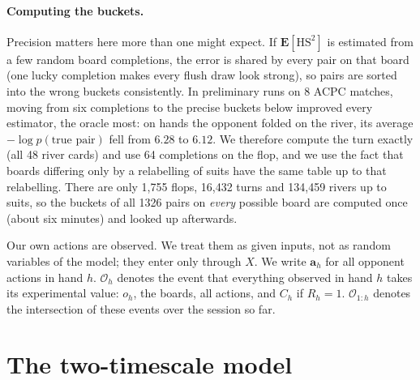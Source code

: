 \documentclass[11pt,a4paper]{article}
\newcommand{\C}{C}            %
\newcommand{\X}{X}            %
\newcommand{\R}{R}            %
\newcommand{\1}{\mathbf{1}}
\begin{document}
\paragraph{Computing the buckets.} Precision matters here more than one might
expect. If $\mathbf{E}[\mathrm{HS}^2]$ is estimated from a few random board
completions, the error is shared by every pair on that board (one lucky
completion makes every flush draw look strong), so pairs are sorted into the
wrong buckets consistently. In preliminary runs on 8 ACPC matches, moving from
six completions to the precise buckets below improved every estimator, the
oracle most: on hands the opponent folded on the river, its average
$-\log p(\text{true pair})$ fell from $6.28$ to $6.12$. We therefore compute the turn exactly (all 48 river cards)
and use 64 completions on the flop, and we use the fact that boards differing
only by a relabelling of suits have the same table up to that relabelling. There
are only 1{,}755 flops, 16{,}432 turns and 134{,}459 rivers up to suits, so the
buckets of all 1326 pairs on \emph{every} possible board are computed once
(about six minutes) and looked up afterwards.

Our own actions are observed. We treat them as given inputs, not as random
variables of the model; they enter only through $\X$. We write $\mathbf{a}_h$
for all opponent actions in hand $h$. $\mathcal{O}_h$ denotes the event that
everything observed in hand $h$ takes its experimental value: $o_h$, the boards,
all actions, and $\C_h$ if $\R_h=1$. $\mathcal{O}_{1:h}$ denotes the
intersection of these events over the session so far.

\section{The two-timescale model}\label{sec:model}
\end{document}
